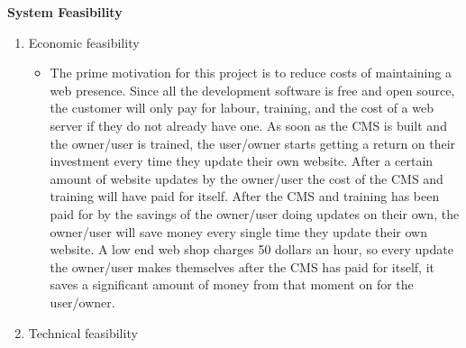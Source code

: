 \documentclass[11pt]{article}
\begin{document}
    \vspace{10 mm}


\textbf{System Feasibility}

\begin{enumerate}
    \item Economic feasibility
    
    \begin{itemize}
    \item The prime motivation for this project is to reduce costs of maintaining a web presence. Since all the development software is free and open source, the customer will only pay for labour, training, and the cost of a web server if they do not already have one. As soon as the CMS is built and the owner/user is trained, the user/owner starts getting a return on their investment every time they update their own website. After a certain amount of website updates by the owner/user the cost of the CMS and training will have paid for itself. After the CMS and training has been paid for by the savings of the owner/user doing updates on their own, the owner/user will save money every single time they update their own website. A low end web shop charges 50 dollars an hour, so every update the owner/user makes themselves after the CMS has paid for itself, it saves a significant amount of money from that moment on for the user/owner.  
    \end{itemize}
    
    \item Technical feasibility
    

\end{enumerate}
\end{document}
